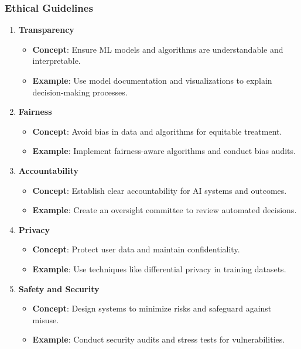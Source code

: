 \documentclass{beamer}
\begin{document}
\begin{frame}[fragile]
    \frametitle{Ethical Guidelines}
    \begin{enumerate}
        \item \textbf{Transparency}
            \begin{itemize}
                \item \textbf{Concept}: Ensure ML models and algorithms are understandable and interpretable.
                \item \textbf{Example}: Use model documentation and visualizations to explain decision-making processes.
            \end{itemize}
        
        \item \textbf{Fairness}
            \begin{itemize}
                \item \textbf{Concept}: Avoid bias in data and algorithms for equitable treatment.
                \item \textbf{Example}: Implement fairness-aware algorithms and conduct bias audits.
            \end{itemize}
        
        \item \textbf{Accountability}
            \begin{itemize}
                \item \textbf{Concept}: Establish clear accountability for AI systems and outcomes.
                \item \textbf{Example}: Create an oversight committee to review automated decisions.
            \end{itemize}
        
        \item \textbf{Privacy}
            \begin{itemize}
                \item \textbf{Concept}: Protect user data and maintain confidentiality.
                \item \textbf{Example}: Use techniques like differential privacy in training datasets.
            \end{itemize}
        
        \item \textbf{Safety and Security}
            \begin{itemize}
                \item \textbf{Concept}: Design systems to minimize risks and safeguard against misuse.
                \item \textbf{Example}: Conduct security audits and stress tests for vulnerabilities.
            \end{itemize}
    \end{enumerate}
\end{frame}
\end{document}

